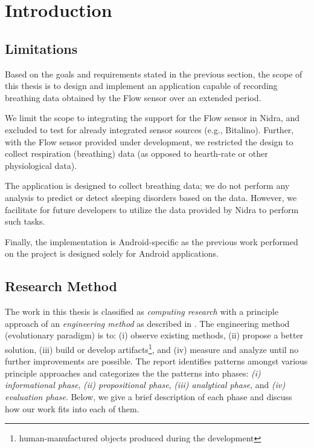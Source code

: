 \chapter{Introduction}\label{introduction}




\section{Limitations}
Based on the goals and requirements stated in the previous section, the scope of this thesis is to design and implement an application capable of recording breathing data obtained by the Flow sensor over an extended period. 

We limit the scope to integrating the support for the Flow sensor in Nidra, and excluded to test for already integrated sensor sources (e.g., Bitalino). Further, with the Flow sensor provided under development, we restricted the design to collect respiration (breathing) data (as opposed to hearth-rate or other physiological data).

The application is designed to collect breathing data; we do not perform any analysis to predict or detect sleeping disorders based on the data. However, we facilitate for future developers to utilize the data provided by Nidra to perform such tasks.

Finally, the implementation is Android-specific as the previous work performed on the project is designed solely for Android applications. 

\section{Research Method}
The work in this thesis is classified as \textit{computing research} with a principle approach of an \textit{engineering method} as described in \cite{Glass_1995}. The engineering method (evolutionary paradigm) is to: (i) observe existing methods, (ii) propose a better solution, (iii)  build or develop artifacts\footnote{human-manufactured objects produced during the development}, and (iv) measure and analyze until no further improvements are possible. The report identifies patterns amongst various principle approaches and categorizes the the patterns into phases: \textit{(i) informational phase}, \textit{(ii) propositional phase}, \textit{(iii) analytical phase}, and \textit{(iv) evaluation phase}. Below, we give a brief description of each phase and discuss how our work fits into each of them. 

